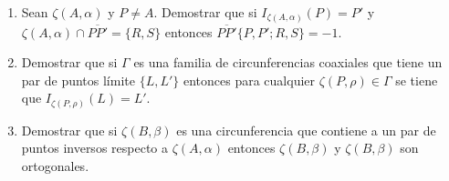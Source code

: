 \documentclass[10pt]{report}
\newcommand{\R}{\mathbb R}
\begin{document}
\begin{enumerate}

\item Sean $\zeta(A, \alpha)$ y $P \neq A$. Demostrar que si $I_{\zeta(A, \alpha)} (P) = P'$ y $\zeta(A, \alpha) \cap \overline{PP'} = \{ R, S \}$ entonces $\overline{PP'}\{P, P'; R, S\} = -1$.


\item Demostrar que si $\Gamma$ es una familia de circunferencias coaxiales que tiene un par de puntos límite $\{L,L'\}$ entonces para cualquier $\zeta(P,\rho) \in \Gamma$ se tiene que $I_{\zeta(P, \rho)}(L) = L'$.

\item Demostrar que si $\zeta(B, \beta)$ es una circunferencia que contiene a un par de puntos inversos respecto a $\zeta(A, \alpha)$ entonces $\zeta(B,\beta)$ y $\zeta(B, \beta)$ son ortogonales.







\end{enumerate}
\end{document}
